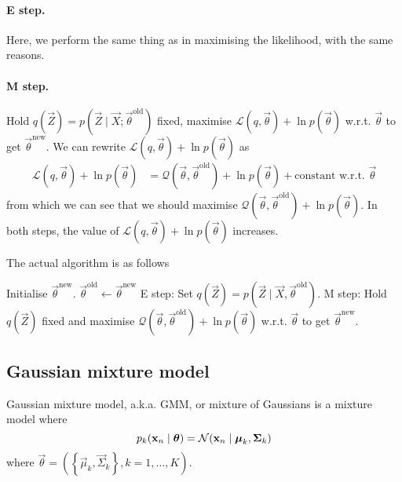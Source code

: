 \paragraph{E step.} Here, we perform the same thing as in maximising the likelihood, with the same reasons.
\paragraph{M step.} Hold $q(\vec Z) = p(\vec Z \mid \vec X; \vec \theta^{\text{old}})$ fixed, maximise $\mathcal L\left(q, \vec \theta\right) + \ln p(\vec \theta)$ w.r.t. $\vec \theta$ to get $\vec \theta^{\text{new}}$. We can rewrite $\mathcal L\left(q, \vec \theta\right) + \ln p(\vec \theta)$ as
\begin{align*}
    \mathcal L\left(q, \vec \theta\right) + \ln p(\vec \theta)  &= \mathcal Q\left(\vec \theta, \vec \theta^{\text{old}}\right) + \ln p(\vec \theta) + \text{constant w.r.t. } \vec \theta
\end{align*}
from which we can see that we should maximise $\mathcal Q\left(\vec \theta, \vec \theta^{\text{old}}\right) + \ln p(\vec \theta)$. In both steps, the value of $\mathcal L(q, \vec \theta) + \ln p(\vec \theta)$ increases.

The actual algorithm is as follows
\begin{algorithmbis}\label{alg:em-post}
    \begin{algorithmic}[1]
        \State Initialise $\vec \theta^{\text{new}}$.
        \Repeat
            \State $\vec \theta^{\text{old}} \gets \vec \theta^{\text{new}}$
            \State E step: Set $q(\vec Z) = p\left(\vec Z \mid \vec X, \vec \theta^{\text{old}}\right)$.
            \State M step: Hold $q(\vec Z)$ fixed and maximise $\mathcal Q\left(\vec \theta, \vec \theta^{\text{old}}\right) + \ln p(\vec \theta)$ w.r.t. $\vec \theta$ to get $\vec \theta^{\text{new}}$.
    \end{algorithmic}
\end{algorithmbis}

\subsection{Gaussian mixture model}
Gaussian mixture model, a.k.a. GMM, or mixture of Gaussians is a mixture model where
\begin{equation}
    p_k(\boldsymbol{\mathbf{x}}_n \mid \boldsymbol{\mathbf{\theta}}) = \operatorname{\mathcal N}(\boldsymbol{\mathbf{x}}_n \mid \boldsymbol{\mathbf{\mu}}_k, \boldsymbol{\mathbf{\Sigma}}_k)
\end{equation}
where $\vec \theta = \left(\left\{\vec \mu_k, \vec \Sigma_k\right\}, k = 1, \dotsc, K\right)$.